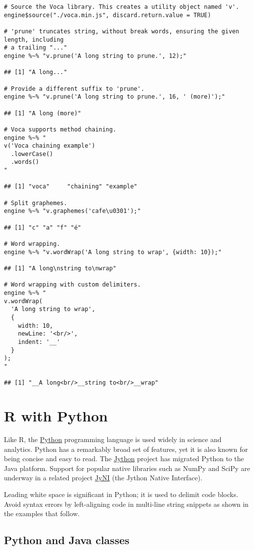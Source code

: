 \begin{verbatim}
# Source the Voca library. This creates a utility object named 'v'.
engine$source("./voca.min.js", discard.return.value = TRUE)

# 'prune' truncates string, without break words, ensuring the given length, including
# a trailing "..."
engine %~% "v.prune('A long string to prune.', 12);"

## [1] "A long..."

# Provide a different suffix to 'prune'.
engine %~% "v.prune('A long string to prune.', 16, ' (more)');"

## [1] "A long (more)"

# Voca supports method chaining.
engine %~% "
v('Voca chaining example')
  .lowerCase()
  .words()
"

## [1] "voca"     "chaining" "example"

# Split graphemes.
engine %~% "v.graphemes('cafe\u0301');"

## [1] "c" "a" "f" "é"

# Word wrapping.
engine %~% "v.wordWrap('A long string to wrap', {width: 10});"

## [1] "A long\nstring to\nwrap"

# Word wrapping with custom delimiters.
engine %~% "
v.wordWrap(
  'A long string to wrap',
  {
    width: 10,
    newLine: '<br/>',
    indent: '__'
  }
);
"

## [1] "__A long<br/>__string to<br/>__wrap"
\end{verbatim}

\section{R with Python}

Like R, the \href{https://www.python.org/}{Python} programming language is used widely in science and analytics. Python has a remarkably broad set of features, yet it is also known for being concise and easy to read. The \href{http://www.jython.org/}{Jython} project has migrated Python to the Java platform. Support for popular native libraries such as NumPy and SciPy are underway in a related project \href{http://www.jyni.org/}{JyNI} (the Jython Native Interface).

 Leading white space is significant in Python; it is used to delimit code blocks. Avoid syntax errors by left-aligning code in multi-line string snippets as shown in the examples that follow.

\subsection{Python and Java classes}

